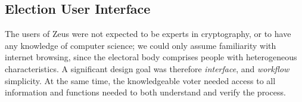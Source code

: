 \documentclass[letterpaper,10pt]{article}
\begin{document}
\subsection{Election User Interface}

The users of Zeus were not expected to be experts in cryptography, or
to have any knowledge of computer science; we could only assume
familiarity with internet browsing, since the electoral body comprises
people with heterogeneous characteristics. A significant design goal
was therefore \emph{interface}, and \emph{workflow} simplicity. At the
same time, the knowledgeable voter needed access to all information
and functions needed to both understand and verify the process.





\end{document}
